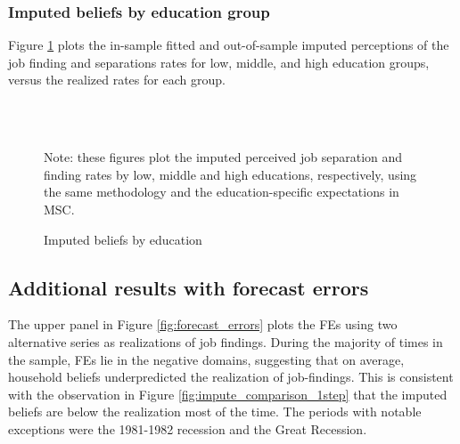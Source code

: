 \subsubsection{Imputed beliefs by education group}

Figure \ref{fig:impute_by_education} plots the in-sample fitted and out-of-sample imputed perceptions of the job finding and separations rates for low, middle, and high education groups, versus the realized rates for each group. 

 \begin{figure}[pt]
    	\caption{Imputed beliefs by education}
    	\label{fig:impute_by_education}
    	\begin{center}
 	  \\
 	 	 \\
    	\end{center}
    	
    	\begin{flushleft}\footnotesize {Note: these figures plot the imputed perceived job separation and finding rates by low, middle and high educations, respectively, using the same methodology and the education-specific expectations in MSC.}\end{flushleft}
    \end{figure}

   

\subsection{Additional results with forecast errors}
\label{appendix:fe_results_more}

    The upper panel in Figure \ref{fig:forecast_errors} plots the FEs using two alternative series as realizations of job findings. During the majority of times in the sample, FEs lie in the negative domains, suggesting that on average, household beliefs underpredicted the realization of job-findings. This is consistent with the observation in Figure \ref{fig:impute_comparison_1step} that the imputed beliefs are below the realization most of the time. The periods with notable exceptions were the 1981-1982 recession and the Great Recession.
    
